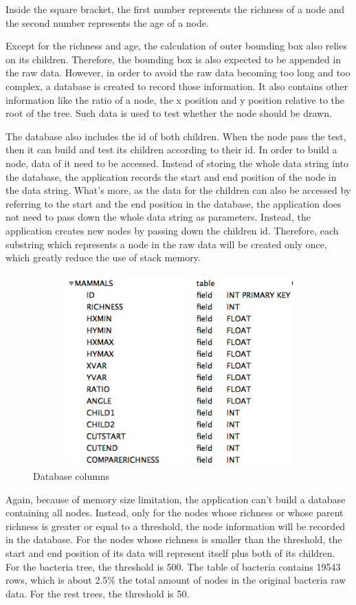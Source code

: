 \documentclass[MSc]{icldt}
\begin{document}
Inside the square bracket, the first number represents the richness of a node and the second number represents the age of a node.

Except for the richness and age, the calculation of outer bounding box also relies on its children. Therefore, the bounding box is also expected to be appended in the raw data. However, in order to avoid the raw data becoming too long and too complex, a database is created to record those information. It also contains other information like the ratio of a node, the x position and y position relative to the root of the tree. Such data is used to test whether the node should be drawn. 

The database also includes the id of both children. When the node pass the test, then it can build and test its children according to their id. In order to build a node, data of it need to be accessed. Instead of storing the whole data string into the database, the application records the start and end position of the node in the data string. What's more, as the data for the children can also be accessed by referring to the start and the end position in the database, the application does not need to pass down the whole data string as parameters. Instead, the application creates new nodes by passing down the children id. Therefore, each substring which represents a node in the raw data will be created only once, which greatly reduce the use of stack memory. 

\begin{figure}[H]
  \centering
  \includegraphics [width=12.5cm,height=7.4cm]{Database}
  \caption{Database columns}
\end{figure}

Again, because of memory size limitation, the application can't build a database containing all nodes. Instead, only for the nodes whose richness or whose parent richness is greater or equal to a threshold, the node information will be recorded in the database. For the nodes whose richness is smaller than the threshold, the start and end position of its data will represent itself plus both of its children. For the bacteria tree, the threshold is 500. The table of bacteria contains  19543 rows, which is about 2.5\% the total amount of nodes in the original bacteria raw data. For the rest trees, the threshold is 50.
\end{document}

